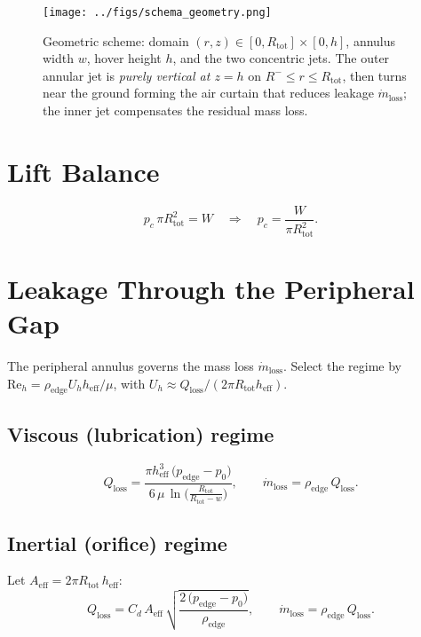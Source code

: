 \documentclass[11pt,a4paper]{article}
\begin{document}
\begin{figure}[t]
  \centering
  \texttt{[image: ../figs/schema\_geometry.png]}
  \caption{Geometric scheme: domain $(r,z)\in[0,R_{\text{tot}}]\times[0,h]$, annulus width $w$, hover height $h$, and the two concentric jets. The outer annular jet is \emph{purely vertical at $z=h$} on $R^-\!\le r\!\le R_{\text{tot}}$, then turns near the ground forming the air curtain that reduces leakage $\dot m_{\mathrm{loss}}$; the inner jet compensates the residual mass loss.}
  \label{fig:geometry}
\end{figure}

\section{Lift Balance}
\begin{equation}
  p_c\,\pi R_{\text{tot}}^2 = W
  \quad \Rightarrow \quad
  p_c = \frac{W}{\pi R_{\text{tot}}^2}.
  \label{eq:lift}
\end{equation}

\section{Leakage Through the Peripheral Gap}
The peripheral annulus governs the mass loss $\dot m_{\mathrm{loss}}$. Select the regime by $\mathrm{Re}_h=\rho_\mathrm{edge} U_h h_{\mathrm{eff}}/\mu$, with $U_h\approx Q_{\mathrm{loss}}/(2\pi R_{\text{tot}} h_{\mathrm{eff}})$.
\subsection*{Viscous (lubrication) regime}
\begin{equation}
  Q_{\mathrm{loss}}
  = \frac{\pi h_{\mathrm{eff}}^{3}\,\big(p_\mathrm{edge}-p_0\big)}{6\,\mu\,\ln\!\big(\tfrac{R_{\text{tot}}}{R_{\text{tot}}-w}\big)},
  \qquad \dot m_{\mathrm{loss}}=\rho_\mathrm{edge}\,Q_{\mathrm{loss}}.
  \label{eq:qloss_lub}
\end{equation}
\subsection*{Inertial (orifice) regime}
Let $A_{\mathrm{eff}}=2\pi R_{\text{tot}}\,h_{\mathrm{eff}}$:
\begin{equation}
  Q_{\mathrm{loss}}
  = C_d\,A_{\mathrm{eff}}\,\sqrt{\frac{2\,\big(p_\mathrm{edge}-p_0\big)}{\rho_\mathrm{edge}}},
  \qquad \dot m_{\mathrm{loss}}=\rho_\mathrm{edge}\,Q_{\mathrm{loss}}.
  \label{eq:qloss_orif}
\end{equation}
\end{document}
